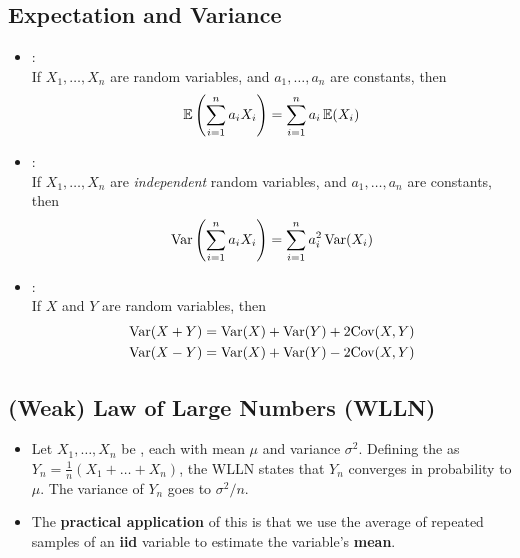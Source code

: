\documentclass[11pt]{article}
\begin{document}
\subsection{Expectation and Variance}
\label{sec:ExpVar}
\begin{itemize}
  \item {}:\\
  If $X_1, \dots, X_n$ are random variables, and $a_1, \dots, a_n$ are constants, then
  \begin{equation}
    \mathbb{E} \left( \sum_{i=1}^n a_i X_i \right) = \sum_{i=1}^n a_i\, \mathbb{E} (X_i)
  \end{equation}

  \item {}:\\
  If $X_1, \dots, X_n$ are \emph{independent} random variables, and $a_1, \dots, a_n$
  are constants, then
  \begin{equation}
    \textrm{Var} \left( \sum_{i=1}^n a_i X_i \right) = \sum_{i=1}^n a_i^2\, \textrm{Var} (X_i)
  \end{equation}

  \item {}:\\
  If $X$ and $Y$ are random variables, then
  \begin{align}
    \textrm{Var} (X + Y) &= \textrm{Var}(X) + \textrm{Var}(Y) + 2 \textrm{Cov}(X, Y) \nonumber\\
    \textrm{Var} (X - Y) &= \textrm{Var}(X) + \textrm{Var}(Y) - 2 \textrm{Cov}(X, Y)
  \end{align}
  
\end{itemize}

\subsection{(Weak) Law of Large Numbers (WLLN)}
\label{subsec:wlln}
\begin{itemize}
  \item Let $X_1, \dots, X_n$ be , each with mean $\mu$ and variance
  $\sigma^{2}$. Defining the  as
  $Y_n = \frac{1}{n} (X_1 + \dots + X_n)$, the WLLN states that $Y_n$ converges in
  probability to $\mu$. The variance of $Y_n$ goes to $\sigma^{2}/n$.

  \item The \textbf{practical application} of this is that we use the average of
  repeated samples of an \textbf{iid} variable to estimate the variable's \textbf{mean}.

\end{itemize}
\end{document}
